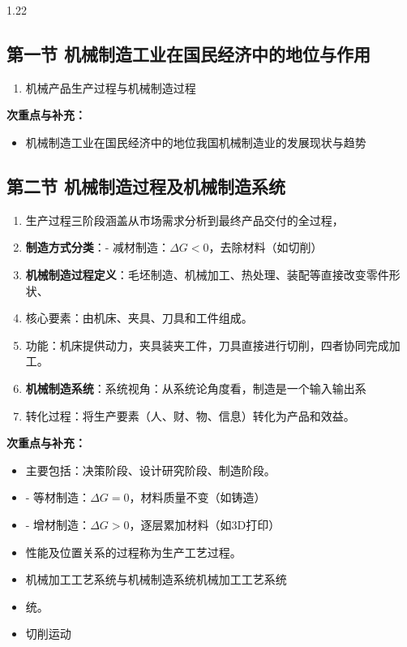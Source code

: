 \documentclass[12pt,a4paper]{article}
\begin{document}
\begin{spacing}{1.22}
\subsection{第一节 机械制造工业在国民经济中的地位与作用}
\begin{tcolorbox}[colback=yellow!6,colframe=red!55!black,title=重点,left=1mm,right=1mm]
\begin{enumerate}[leftmargin=2.2em,label=\arabic*.]
  \item 机械产品生产过程与机械制造过程
\end{enumerate}
\end{tcolorbox}
\noindent\textbf{次重点与补充：}
\begin{itemize}[leftmargin=2.2em,label=--]
  \item 机械制造工业在国民经济中的地位我国机械制造业的发展现状与趋势
\end{itemize}

\subsection{第二节 机械制造过程及机械制造系统}
\begin{tcolorbox}[colback=yellow!6,colframe=red!55!black,title=重点,left=1mm,right=1mm]
\begin{enumerate}[leftmargin=2.2em,label=\arabic*.]
  \item 生产过程三阶段涵盖从市场需求分析到最终产品交付的全过程，
  \item \textbf{制造方式分类}：- 减材制造：$\Delta G<0$，去除材料（如切削）
  \item \textbf{机械制造过程定义}：毛坯制造、机械加工、热处理、装配等直接改变零件形状、
  \item 核心要素：由机床、夹具、刀具和工件组成。
  \item 功能：机床提供动力，夹具装夹工件，刀具直接进行切削，四者协同完成加工。
  \item \textbf{机械制造系统}：系统视角：从系统论角度看，制造是一个输入输出系
  \item 转化过程：将生产要素（人、财、物、信息）转化为产品和效益。
\end{enumerate}
\end{tcolorbox}
\noindent\textbf{次重点与补充：}
\begin{itemize}[leftmargin=2.2em,label=--]
  \item 主要包括：决策阶段、设计研究阶段、制造阶段。
  \item - 等材制造：$\Delta G=0$，材料质量不变（如铸造）
  \item - 增材制造：$\Delta G>0$，逐层累加材料（如3D打印）
  \item 性能及位置关系的过程称为生产工艺过程。
  \item 机械加工工艺系统与机械制造系统机械加工工艺系统
  \item 统。
  \item 切削运动
\end{itemize}


\end{spacing}
\end{document}
